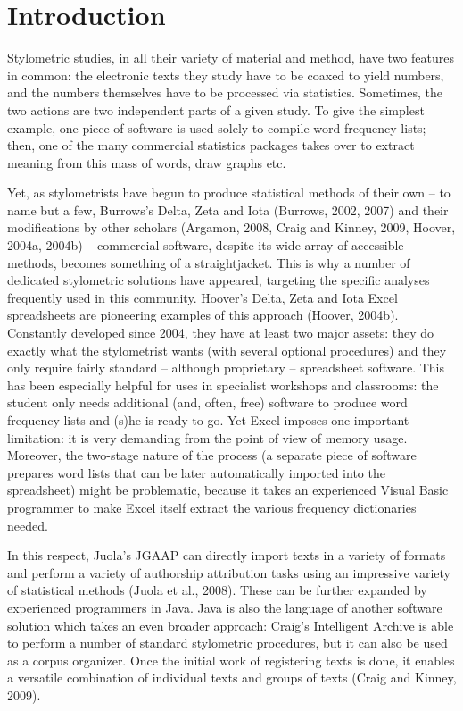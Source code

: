 \documentclass[11pt,a4paper]{article}
\begin{document}
\section{Introduction}

Stylometric studies, in all their variety of material and method,
have two features in common: the electronic texts they study have
to be coaxed to yield numbers, and the numbers themselves have to
be processed via statistics. Sometimes, the two actions are two independent
parts of a given study. To give the simplest example, one piece of
software is used solely to compile word frequency lists; then, one
of the many commercial statistics packages takes over to extract meaning
from this mass of words, draw graphs etc.

Yet, as stylometrists have begun to produce statistical methods of
their own – to name but a few, Burrows’s Delta, Zeta and Iota (Burrows,
2002, 2007) and their modifications by other scholars (Argamon, 2008,
Craig and Kinney, 2009, Hoover, 2004a, 2004b) – commercial software,
despite its wide array of accessible methods, becomes something of
a straightjacket. This is why a number of dedicated stylometric solutions
have appeared, targeting the specific analyses frequently used in
this community. Hoover’s Delta, Zeta and Iota Excel spreadsheets are
pioneering examples of this approach (Hoover, 2004b). Constantly developed
since 2004, they have at least two major assets: they do exactly what
the stylometrist wants (with several optional procedures) and they
only require fairly standard -- although proprietary -- spreadsheet
software. This has been especially helpful for uses in specialist
workshops and classrooms: the student only needs additional (and,
often, free) software to produce word frequency lists and (s)he is
ready to go. Yet Excel imposes one important limitation: it is very
demanding from the point of view of memory usage. Moreover, the two-stage
nature of the process (a separate piece of software prepares word
lists that can be later automatically imported into the spreadsheet)
might be problematic, because it takes an experienced Visual Basic
programmer to make Excel itself extract the various frequency dictionaries
needed.

In this respect, Juola's JGAAP can directly import texts in a variety
of formats and perform a variety of authorship attribution tasks using
an impressive variety of statistical methods (Juola et al., 2008).
These can be further expanded by experienced programmers in Java.
Java is also the language of another software solution which takes
an even broader approach: Craig's Intelligent Archive is able to perform
a number of standard stylometric procedures, but it can also be used
as a corpus organizer. Once the initial work of registering texts
is done, it enables a versatile combination of individual texts and
groups of texts (Craig and Kinney, 2009).
\end{document}
